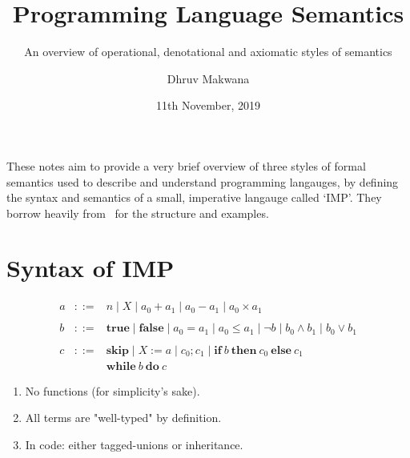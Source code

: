 \usepackage{proof}
\usepackage{ebproof}
\usepackage{listings}

\title{Programming Language Semantics}
\subtitle{An overview of operational, denotational and axiomatic styles of semantics}
\date{11th November, 2019}
\author{Dhruv Makwana}

\graphicspath{{./graphics/}}


\addtolength{\jot}{0.5\baselineskip}

\newcommand{\den}[2]{ \mathcal{#1} [\![ #2 ]\!] }%
\newcommand{\denA}[1]{ \den{A}{#1} }%
\newcommand{\denB}[1]{ \den{B}{#1} }%
\newcommand{\denC}[1]{ \den{C}{#1} }%



\maketitle

\mode*  %

These notes aim to provide a very brief overview of three styles of formal
semantics used to describe and understand programming langauges, by
defining the syntax and semantics of a small, imperative langauge called `IMP'.
They borrow heavily from~\citet{winskel1993formal} for the structure and
examples.

\section{Syntax of IMP}

\begin{frame}
    \[\begin{array}{rcl}
        a & ::= & n
                \mid X
                \mid a_0 + a_1
                \mid a_0 - a_1
                \mid a_0 \times a_1 \\
                \\
        b & ::= & \mathbf{true}
                \mid \mathbf{false}
                \mid a_0 = a_1
                \mid a_0 \leq a_1
                \mid ¬b
                \mid b_0 \wedge b_1
                \mid b_0 \vee b_1 \\
                \\
        c & ::= & \mathbf{skip}
                \mid X := a
                \mid c_0; c_1
                \mid \mathbf{if}\ b\ \mathbf{then}\ c_0\ \mathbf{else}\ c_1 \\
                && \mathbf{while}\ b\ \mathbf{do}\ c
    \end{array} \]
    \pause
    \begin{enumerate}
        \item No functions (for simplicity's sake).
        \item All terms are "well-typed" by definition.
        \item In code: either tagged-unions or inheritance.
    \end{enumerate}
\end{frame}


